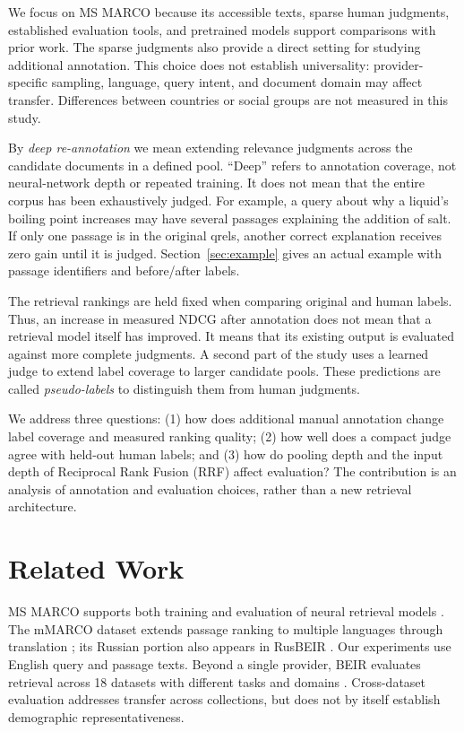 \documentclass[runningheads,a4paper]{llncs}
\begin{document}
We focus on MS MARCO because its accessible texts, sparse human judgments, established evaluation tools, and pretrained models support comparisons with prior work. The sparse judgments also provide a direct setting for studying additional annotation. This choice does not establish universality: provider-specific sampling, language, query intent, and document domain may affect transfer. Differences between countries or social groups are not measured in this study.

By \emph{deep re-annotation} we mean extending relevance judgments across the candidate documents in a defined pool. ``Deep'' refers to annotation coverage, not neural-network depth or repeated training. It does not mean that the entire corpus has been exhaustively judged. For example, a query about why a liquid's boiling point increases may have several passages explaining the addition of salt. If only one passage is in the original qrels, another correct explanation receives zero gain until it is judged. Section~\ref{sec:example} gives an actual example with passage identifiers and before/after labels.

The retrieval rankings are held fixed when comparing original and human labels. Thus, an increase in measured NDCG after annotation does not mean that a retrieval model itself has improved. It means that its existing output is evaluated against more complete judgments. A second part of the study uses a learned judge to extend label coverage to larger candidate pools. These predictions are called \emph{pseudo-labels} to distinguish them from human judgments.

We address three questions: (1) how does additional manual annotation change label coverage and measured ranking quality; (2) how well does a compact judge agree with held-out human labels; and (3) how do pooling depth and the input depth of Reciprocal Rank Fusion (RRF) \cite{cormack2009rrf} affect evaluation? The contribution is an analysis of annotation and evaluation choices, rather than a new retrieval architecture.

\section{Related Work}
\label{sec:related}

MS MARCO supports both training and evaluation of neural retrieval models \cite{bajaj2016msmarco}. The mMARCO dataset extends passage ranking to multiple languages through translation \cite{bonifacio2022mmarco}; its Russian portion also appears in RusBEIR \cite{2025rusbeir}. Our experiments use English query and passage texts. Beyond a single provider, BEIR evaluates retrieval across 18 datasets with different tasks and domains \cite{thakur2021beir}. Cross-dataset evaluation addresses transfer across collections, but does not by itself establish demographic representativeness.
\end{document}
